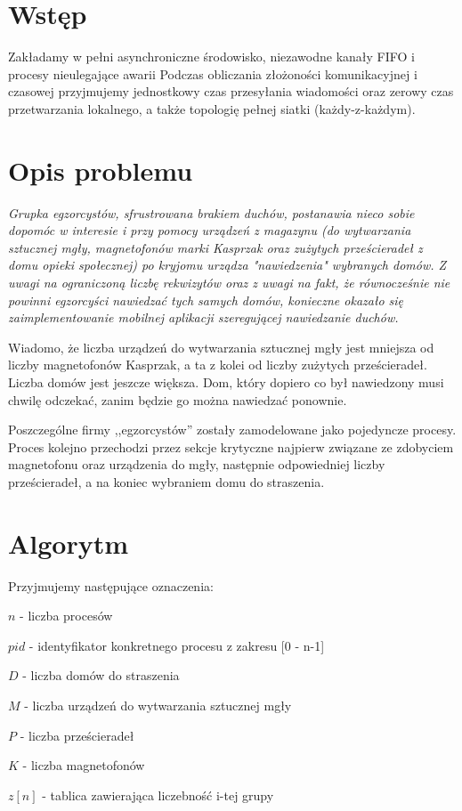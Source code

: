 \documentclass{article}
\begin{document}


\section{Wstęp}
Zakładamy w pełni asynchroniczne środowisko, niezawodne kanały FIFO i procesy nieulegające awarii Podczas obliczania złożoności komunikacyjnej i czasowej przyjmujemy jednostkowy czas przesyłania wiadomości oraz zerowy czas przetwarzania lokalnego, a także topologię pełnej siatki (każdy-z-każdym).

\section{Opis problemu}

\begin{displayquote}
\textit{Grupka egzorcystów, sfrustrowana brakiem duchów, postanawia nieco sobie dopomóc w interesie i przy pomocy urządzeń z magazynu (do wytwarzania sztucznej mgły, magnetofonów marki Kasprzak oraz zużytych prześcieradeł z domu opieki społecznej) po kryjomu urządza "nawiedzenia" wybranych domów. 
Z uwagi na ograniczoną liczbę rekwizytów oraz z uwagi na fakt, że równocześnie nie powinni egzorcyści nawiedzać tych samych domów, konieczne okazało się zaimplementowanie mobilnej aplikacji szeregującej nawiedzanie duchów.}
\end{displayquote}

Wiadomo, że liczba urządzeń do wytwarzania sztucznej mgły jest mniejsza od liczby magnetofonów Kasprzak, a ta z kolei od liczby zużytych prześcieradeł. 
Liczba domów jest jeszcze większa. 
Dom, który dopiero co był nawiedzony musi chwilę odczekać, zanim będzie go można nawiedzać ponownie.

Poszczególne firmy ,,egzorcystów'' zostały zamodelowane jako pojedyncze procesy.
Proces kolejno przechodzi przez sekcje krytyczne najpierw związane ze zdobyciem magnetofonu oraz urządzenia do mgły, następnie odpowiedniej liczby prześcieradeł, a na koniec wybraniem domu do straszenia.

\section{Algorytm}

Przyjmujemy następujące oznaczenia:
\begin{tightlist}
    \item $n$ - liczba procesów
    \item $pid$ - identyfikator konkretnego procesu z zakresu [0 - n-1]
    \item $D$ - liczba domów do straszenia
    \item $M$ - liczba urządzeń do wytwarzania sztucznej mgły
    \item $P$ - liczba prześcieradeł
    \item $K$ - liczba magnetofonów
    \item $z[n]$ - tablica zawierająca liczebność i-tej grupy
\end{tightlist}
\end{document}
